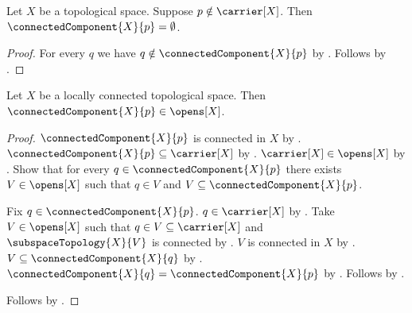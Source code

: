 \begin{theorem}\label{connected_component_outside_carrier}
    Let $X$ be a topological space.
    Suppose $p\notin\carrier[X]$.
    Then $\connectedComponent{X}{p}=\emptyset$.
\end{theorem}
\begin{proof}
    For every $q$ we have $q\notin\connectedComponent{X}{p}$ by
        .
    Follows by .
\end{proof}

\begin{theorem}\label{locally_connected_components_are_open}
    Let $X$ be a locally connected topological space.
    Then $\connectedComponent{X}{p}\in\opens[X]$.
\end{theorem}
\begin{proof}
    $\connectedComponent{X}{p}$ is connected in $X$ by .
    $\connectedComponent{X}{p}\subseteq\carrier[X]$ by .
    $\carrier[X]\in\opens[X]$ by .
    Show that for every $q\in\connectedComponent{X}{p}$ there exists $V\in\opens[X]$ such that
        $q\in V$ and $V\subseteq\connectedComponent{X}{p}$.
    \begin{subproof}
        Fix $q\in\connectedComponent{X}{p}$.
        $q\in\carrier[X]$ by .
        Take $V\in\opens[X]$ such that $q\in V\subseteq\carrier[X]$ and
            $\subspaceTopology{X}{V}$ is connected by .
        $V$ is connected in $X$ by .
        $V\subseteq\connectedComponent{X}{q}$ by .
        $\connectedComponent{X}{q}=\connectedComponent{X}{p}$ by .
        Follows by \auto.
    \end{subproof}
    Follows by .
\end{proof}
